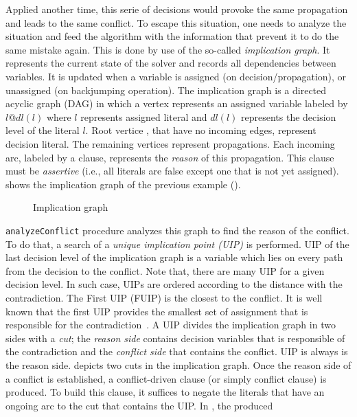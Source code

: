 Applied another time, this serie of decisions would provoke the same propagation and leads to the same conflict. 
To escape this situation, one needs to analyze the situation and feed the algorithm with the information that prevent it to do the 
same mistake again. This is done by use of the so-called \emph{implication graph}.
It represents the current state of the solver and records all dependencies between  variables. It is updated when a variable is assigned 
(on decision/propagation), or unassigned (on backjumping operation). The implication graph is a directed acyclic graph (DAG) in which a vertex represents an assigned variable labeled by $l@dl(l)$ where $l$ represents assigned literal and $dl(l)$ represents the decision level of the literal $l$.
Root vertice , that have no incoming edges, represent decision literal. The remaining vertices represent
propagations.
Each incoming arc, labeled by a clause, represents the \emph{reason} of this propagation.
This clause must be \textit{assertive} (i.e., all  literals are false except one that is not yet assigned).
 shows the implication graph of the previous example ().
\begin{figure}[!htbp]
 \centering
 
 \caption{Implication graph}
 \label{fig:implication-graph}
\end{figure}
\texttt{analyzeConflict} procedure analyzes this graph to find the reason of the conflict. To do that, a search of a
\emph{unique implication point (UIP)} is performed. UIP of the last decision level of the implication graph is a variable
which lies on every path from the decision to the conflict. Note that, there are many UIP for a given decision level.
In such case, UIPs are ordered according to the distance with the contradiction. The First UIP (FUIP) is the closest to
the conflict. It is well known that the first UIP provides the smallest set of assignment that is responsible for the
contradiction~\cite{zhang2001efficient}.
A UIP divides the implication graph in two sides with a \emph{cut}; the \emph{reason side} contains decision variables 
that is responsible of the contradiction and the \emph{conflict side} that contains the conflict. 
 UIP is always is the 
reason side.  depicts two cuts in the implication graph.
Once the reason side of a conflict is established, a conflict-driven clause (or simply conflict clause) is produced.
To build this clause, it suffices to negate the
literals that have an ongoing arc to the  cut that contains the UIP. In , the produced
